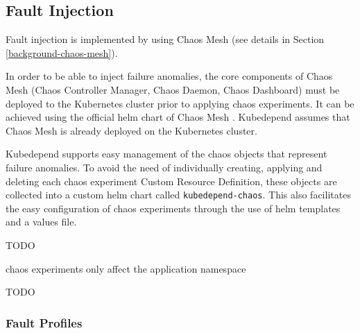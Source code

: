 \subsection{Fault Injection}


Fault injection is implemented by using Chaos Mesh (see details in Section \ref{background-chaos-mesh}).

In order to be able to inject failure anomalies, the core components of Chaos Mesh (Chaos Controller Manager, Chaos Daemon, Chaos Dashboard) must be deployed to the Kubernetes cluster prior to applying chaos experiments. It can be achieved using the official helm chart of Chaos Mesh \cite{ChaosMeshChart}. Kubedepend assumes that Chaos Mesh is already deployed on the Kubernetes cluster.

Kubedepend supports easy management of the chaos objects that represent failure anomalies. To avoid the need of individually creating, applying and deleting each chaos experiment Custom Resource Definition, these objects are collected into a custom helm chart called \texttt{kubedepend-chaos}. This also facilitates the easy configuration of chaos experiments through the use of helm templates and a values file.

TODO

chaos experiments only affect the application namespace

TODO

\subsubsection{Fault Profiles} \label{test-impl-fault-profiles}


